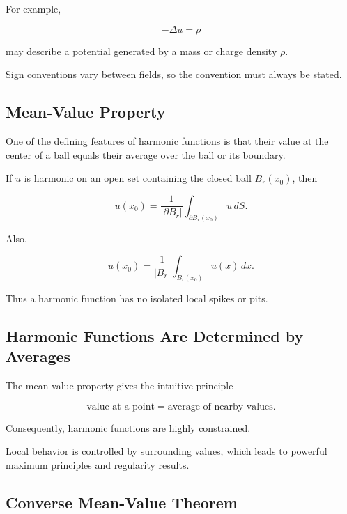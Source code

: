 For example,

\[
\boxed{
-\Delta u=\rho
}
\]

may describe a potential generated by a mass or charge density
\(\rho\).

Sign conventions vary between fields, so the convention must always be
stated.

\subsection{Mean-Value Property}
\label{subsec:harmonic-mean-value-property}

One of the defining features of harmonic functions is that their value
at the center of a ball equals their average over the ball or its
boundary.

\begin{theorem}
If \(u\) is harmonic on an open set containing the closed ball
\(\overline{B_r(x_0)}\), then

\[
\boxed{
u(x_0)
=
\frac{1}{|\partial B_r|}
\int_{\partial B_r(x_0)}
u\,dS.
}
\]

Also,

\[
\boxed{
u(x_0)
=
\frac{1}{|B_r|}
\int_{B_r(x_0)}
u(x)\,dx.
}
\]
\end{theorem}

Thus a harmonic function has no isolated local spikes or pits.

\subsection{Harmonic Functions Are Determined by Averages}
\label{subsec:harmonic-average-interpretation}

The mean-value property gives the intuitive principle

\[
\boxed{
\text{value at a point}
=
\text{average of nearby values}.
}
\]

Consequently, harmonic functions are highly constrained.

Local behavior is controlled by surrounding values, which leads to
powerful maximum principles and regularity results.

\subsection{Converse Mean-Value Theorem}
\label{subsec:converse-mean-value}

